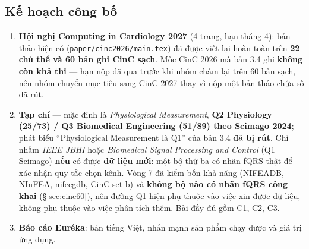 \subsection{Kế hoạch công bố}

\begin{enumerate}[leftmargin=1.8em,itemsep=4pt]
\item \textbf{Hội nghị Computing in Cardiology \textbf{2027}} (4 trang, hạn tháng 4): bản thảo hiện có
(\texttt{paper/cinc2026/main.tex}) đã được viết lại hoàn toàn trên \textbf{22 chủ thể và 60 bản ghi
CinC sạch}. Mốc CinC 2026 mà bản 3.4 ghi \textbf{không còn khả thi} --- hạn nộp đã qua trước khi nhóm
chấm lại trên 60 bản sạch, nên nhóm chuyển mục tiêu sang CinC 2027 thay vì nộp một bản thảo chứa số
đã rút.
\item \textbf{Tạp chí} --- mặc định là \textit{Physiological Measurement}, \textbf{Q2 Physiology
(25/73) / Q3 Biomedical Engineering (51/89) theo Scimago 2024}; phát biểu ``Physiological Measurement
là Q1'' của bản 3.4 \textbf{đã bị rút}. Chỉ nhắm \textit{IEEE JBHI} hoặc \textit{Biomedical Signal
Processing and Control} (Q1 Scimago) \textbf{nếu} có được \textbf{dữ liệu mới}: một bộ thứ ba có nhãn
fQRS thật để xác nhận quy tắc chọn kênh. Vòng 7 đã kiểm bốn khả năng (NIFEADB, NInFEA, nifecgdb,
CinC set-b) và \textbf{không bộ nào có nhãn fQRS công khai} (\S\ref{sec:cinc60}), nên đường Q1 hiện
phụ thuộc vào việc xin được dữ liệu, không phụ thuộc vào việc phân tích thêm. Bài đầy đủ gồm C1, C2, C3.
\item \textbf{Báo cáo Euréka}: bản tiếng Việt, nhấn mạnh sản phẩm chạy được và giá trị ứng dụng.
\end{enumerate}

